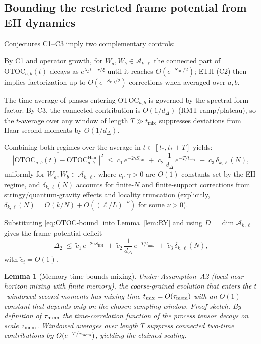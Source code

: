 \documentclass[a4paper,11pt]{article}
\let\mathscr\mathcal
\theoremstyle{plain}
\newtheorem{lemma}{Lemma}
\theoremstyle{definition}
\theoremstyle{remark}
\begin{document}
\subsection*{Bounding the restricted frame potential from EH dynamics}
Conjectures C1--C3 imply two complementary controls:
\begin{description}[leftmargin=*,itemsep=0.3em]
  \item[(Early-to-intermediate times, $t_\ast\lesssim t\ll t_{\mathrm{Th}}$)] By C1 and operator growth, for $W_a,W_b\in \mathscr{A}_{k,\ell}$ the connected part of $\mathrm{OTOC}_{a,b}(t)$ decays as $e^{\lambda_L t - r/\xi}$ until it reaches $O(e^{-S_{\mathrm{BH}}/2})$; ETH (C2) then implies factorization up to $O(e^{-S_{\mathrm{BH}}/2})$ corrections when averaged over $a,b$.
  \item[(Late times, $t\gtrsim t_{\mathrm{Th}}$)] The time average of phases entering $\mathrm{OTOC}_{a,b}$ is governed by the spectral form factor.  By C3, the connected contribution is $O(1/d_\Delta)$ (RMT ramp/plateau), so the $t$-average over any window of length $T\gg t_{\mathrm{mix}}$ suppresses deviations from Haar second moments by $O(1/d_\Delta)$.
\end{description}
Combining both regimes over the average in $t\in[t_\ast,t_\ast+T]$ yields:
\begin{equation}\label{eq:OTOC-bound}
 \overline{\left| \mathrm{OTOC}_{a,b}(t) - \mathrm{OTOC}^{\mathrm{Haar}}_{a,b} \right|^2}
 \;\le\; c_1\, e^{-2\gamma S_{\mathrm{BH}}} \;+\; c_2\, \frac{1}{d_\Delta}\, e^{-T/t_{\mathrm{mix}}}
 \;+\; c_3\, \delta_{k,\ell}(N),
\end{equation}
uniformly for $W_a,W_b\in\mathscr{A}_{k,\ell}$, where $c_i,\gamma>0$ are $O(1)$ constants set by the EH regime, and $\delta_{k,\ell}(N)$ accounts for finite-$N$ and finite-support corrections from stringy/quantum-gravity effects and locality truncation (explicitly, $\delta_{k,\ell}(N)=O(k/N)+O((\ell/L)^{-\nu})$ for some $\nu>0$).

Substituting \eqref{eq:OTOC-bound} into Lemma~\ref{lem:RY} and using $D=\dim \mathscr{A}_{k,\ell}$ gives the frame-potential deficit
\begin{equation}\label{eq:Delta2-bound}
 \Delta_2 \;\le\; \tilde c_1\, e^{-2\gamma S_{\mathrm{BH}}}
 \;+\; \tilde c_2\, \frac{1}{d_\Delta}\, e^{-T/t_{\mathrm{mix}}}
 \;+\; \tilde c_3\, \delta_{k,\ell}(N),
\end{equation}
with $\tilde c_i=O(1)$.

\begin{lemma}[Memory time bounds mixing]
\label{lem:mem-to-mix}
Under Assumption~A2 (local near-horizon mixing with finite memory), the coarse-grained evolution that enters the $t$-windowed second moments
has mixing time $t_{\rm mix}=O(\tau_{\rm mem})$ with an $O(1)$ constant that depends only on the chosen sampling window.
\emph{Proof sketch.} By definition of $\tau_{\rm mem}$ the time-correlation function of the process tensor decays on scale $\tau_{\rm mem}$.
Windowed averages over length $T$ suppress connected two-time contributions by $O(e^{-T/\tau_{\rm mem}})$, yielding the claimed scaling.
\end{lemma}
\end{document}
